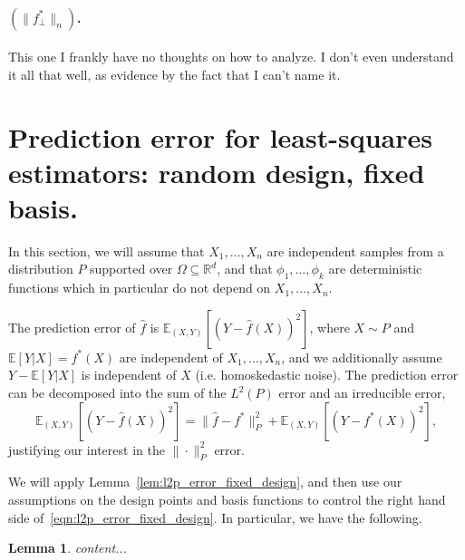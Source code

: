 \documentclass{article}
\newcommand{\Reals}{\mathbb{R}}
\newcommand{\1}{\mathbf{1}}
\newcommand{\Rd}{\Reals^d}
\newcommand{\wh}[1]{\widehat{#1}}
\newtheorem{lemma}{Lemma}
\theoremstyle{definition}
\theoremstyle{remark}
\begin{document}
\paragraph{$(\|f_{\perp}^{\ast}\|_n)$.}

This one I frankly have no thoughts on how to analyze. I don't even understand it all that well, as evidence by the fact that I can't name it.


\clearpage

\section{Prediction error for least-squares estimators: random design, fixed basis.}
In this section, we will assume that $X_1,\ldots,X_n$ are independent samples from a distribution $P$ supported over $\Omega \subseteq \Rd$, and that $\phi_1,\ldots,\phi_k$ are deterministic functions which in particular do not depend on $X_1,\ldots,X_n$.

The prediction error of $\wh{f}$ is $\mathbb{E}_{(X,Y)}[(Y - \wh{f}(X))^2]$, where $X \sim P$ and $\mathbb{E}[Y|X] = f^{\ast}(X)$ are independent of $X_1,\ldots,X_n$, and we additionally assume $Y - \mathbb{E}[Y|X]$ is independent of $X$ (i.e. homoskedastic noise). The prediction error can be decomposed into the sum of the $L^2(P)$ error and an irreducible error,
\begin{equation}
\mathbb{E}_{(X,Y)}[(Y - \wh{f}(X))^2] = \|\wh{f} - f^{\ast}\|_P^2 + \mathbb{E}_{(X,Y)}[(Y - f^{\ast}(X))^2],
\end{equation}
justifying our interest in the $\|\cdot\|_P^2$ error.

We will apply Lemma~\ref{lem:l2p_error_fixed_design}, and then use our assumptions on the design points and basis functions to control the right hand side of~\eqref{eqn:l2p_error_fixed_design}. In particular, we have the following. 
\begin{lemma}
	content...
\end{lemma}
\end{document}
